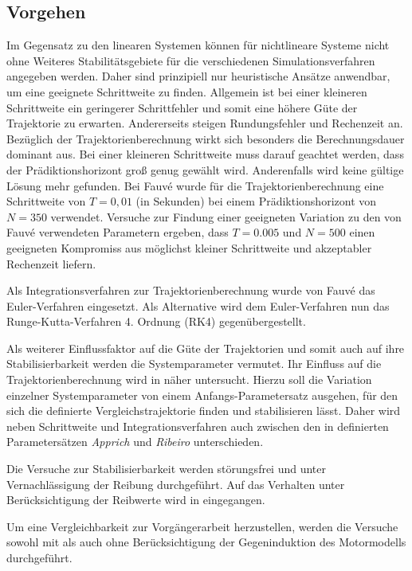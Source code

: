 \subsection{Vorgehen}

Im Gegensatz zu den linearen Systemen können für nichtlineare Systeme nicht ohne Weiteres Stabilitätsgebiete für die verschiedenen Simulationsverfahren angegeben werden. Daher sind prinzipiell nur heuristische Ansätze anwendbar, um eine geeignete Schrittweite zu finden. Allgemein ist bei einer kleineren Schrittweite ein geringerer Schrittfehler und somit eine höhere Güte der Trajektorie zu erwarten. Andererseits steigen Rundungsfehler und Rechenzeit an. Bezüglich der Trajektorienberechnung wirkt sich besonders die Berechnungsdauer dominant aus. Bei einer kleineren Schrittweite muss darauf geachtet werden, dass der Prädiktionshorizont groß genug gewählt wird. Anderenfalls wird keine gültige Lösung mehr gefunden. Bei Fauvé \cite{fauve} wurde für die Trajektorienberechnung eine Schrittweite von $T=0,01$ (in Sekunden) bei einem Prädiktionshorizont von $N=350$ verwendet. Versuche zur Findung einer geeigneten Variation zu den von Fauvé \cite{fauve} verwendeten Parametern ergeben, dass $T=0.005$ und $N=500$ einen geeigneten Kompromiss aus möglichst kleiner Schrittweite und akzeptabler Rechenzeit liefern. 

Als Integrationsverfahren zur Trajektorienberechnung wurde von Fauvé \cite{fauve} das Euler-Verfahren eingesetzt. Als Alternative wird dem Euler-Verfahren nun das Runge-Kutta-Verfahren 4. Ordnung (RK4) gegenübergestellt.

Als weiterer Einflussfaktor auf die Güte der Trajektorien und somit auch auf ihre Stabilisierbarkeit werden die Systemparameter vermutet. Ihr Einfluss auf die Trajektorienberechnung wird in  näher untersucht. Hierzu soll die Variation einzelner Systemparameter von einem Anfangs-Parametersatz ausgehen, für den sich die definierte Vergleichstrajektorie finden und stabilisieren lässt. Daher wird neben Schrittweite und Integrationsverfahren auch zwischen den in  definierten Parametersätzen \textit{Apprich} und \textit{Ribeiro} unterschieden.

Die Versuche zur Stabilisierbarkeit werden störungsfrei und unter Vernachlässigung der Reibung durchgeführt. Auf das Verhalten unter Berücksichtigung der Reibwerte wird in  eingegangen. 

Um eine Vergleichbarkeit zur Vorgängerarbeit herzustellen, werden die Versuche sowohl mit als auch ohne Berücksichtigung der Gegeninduktion des Motormodells durchgeführt. 

